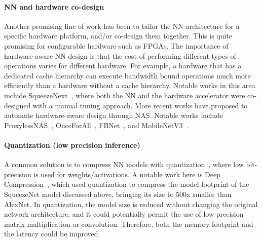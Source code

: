\paragraph*{NN and hardware co-design}
Another promising line of work has been to tailor the NN architecture for a specific hardware
platform, and/or co-design them together. This is quite promising for
configurable hardware such as FPGAs. The importance of hardware-aware NN design is that
the cost of performing different types of operations varies for different hardware.
For example, a hardware that has a dedicated cache hierarchy can execute bandwidth
bound operations much more efficiently than a hardware without a cache hierarchy.
Notable works in this area include SqueezeNext~\cite{gholami2018squeezenext}, where both the NN and the hardware
accelerator were co-designed with a manual tuning approach.
More recent works have proposed to automate hardware-aware design
through NAS.
Notable works include ProxylessNAS~\cite{cai2018proxylessnas}, OnceForAll~\cite{cai2019once}, FBNet~\cite{wu2019fbnet},
and MobileNetV3~\cite{howard2019searching}.

\paragraph*{Quantization (low precision inference)}
A common solution is to compress NN models with quantization~\cite{asanovic1991experimental, hubara2016binarized, rastegari2016xnor, zhou2017incremental, zhou2016dorefa, cai2017deep, jacob2018quantization, zhang2018lq, choi2018pact, wang2019haq, dong2019hawq, chin2020one, cai2020zeroq, gholami2021survey},
where low bit-precision is used for weights/activations.
A notable work here is Deep Compression~\cite{han2015deep}, which used
quantization to compress the model footprint of the
SqueezeNet model discussed above, bringing its size to 500x smaller than AlexNet. 
In quantization, the model size is reduced without changing the original network architecture,
and it could potentially permit the use of low-precision matrix multiplication or convolution. Therefore, both the memory footprint
and the latency could be improved.


